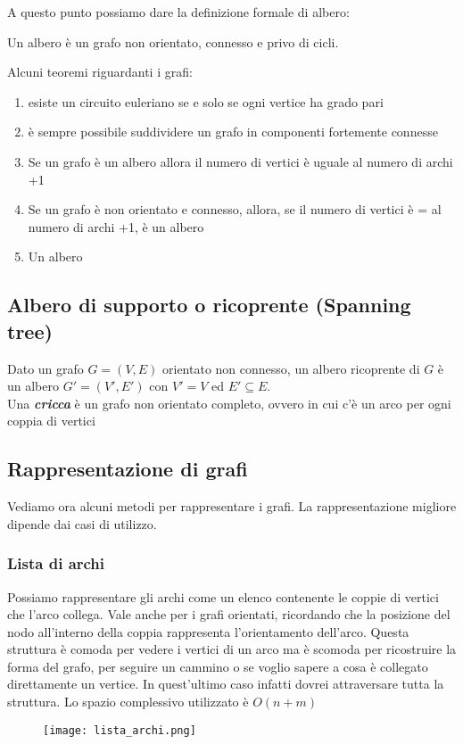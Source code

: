 A questo punto possiamo dare la definizione formale di albero:
\begin{center}
    Un albero è un grafo non orientato, connesso e privo di cicli.
\end{center}

Alcuni teoremi riguardanti i grafi:
\begin{enumerate}
    \item esiste un circuito euleriano se e solo se ogni vertice ha grado pari
    \item è sempre possibile suddividere un grafo in componenti fortemente connesse
    \item Se un grafo è un albero allora il numero di vertici è uguale al numero di archi +1
    \item Se un grafo è non orientato e connesso, allora, se il numero di vertici è = al numero di archi +1, è un albero
    \item Un albero  
\end{enumerate}

\subsection*{Albero di supporto o ricoprente (Spanning tree)}
Dato un grafo $G = (V,E)$ orientato non connesso, un albero ricoprente di $G$
è un albero $G' = (V', E')$ con $V' = V$ ed $E' \subseteq E$.\\
Una \textbf{\emph{cricca}} è un grafo non orientato completo, ovvero in cui c'è un arco per ogni coppia di vertici  
\clearpage

\subsection{Rappresentazione di grafi}
Vediamo ora alcuni metodi per rappresentare i grafi. La rappresentazione migliore dipende dai casi di utilizzo.
\subsubsection{Lista di archi}
Possiamo rappresentare gli archi come un elenco contenente le coppie di vertici
che l'arco collega. Vale anche per i grafi orientati, ricordando che la posizione del 
nodo all'interno della coppia rappresenta l'orientamento dell'arco.
Questa struttura è comoda per vedere i vertici di un arco ma è scomoda per 
ricostruire la forma del grafo, per seguire un cammino o se voglio sapere a cosa è
collegato direttamente un vertice. In quest'ultimo caso infatti dovrei attraversare tutta la struttura.
Lo spazio complessivo utilizzato è $O(n+m)$
\begin{figure}[h]
    \texttt{[image: lista\_archi.png]}
\end{figure}
\clearpage

